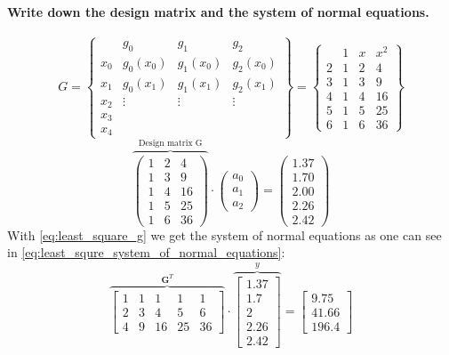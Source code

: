 \paragraph{Write down the design matrix and the system of normal equations.}
$$
G=
\left\{\begin{array}{c|ccc}
 & g_0 & g_1 & g_2 \\
\hline 
x_0 & g_0\left(x_0\right) & g_1\left(x_0\right) & g_2\left(x_0\right) \\
x_1 & g_0\left(x_1\right) & g_1\left(x_1\right) & g_2\left(x_1\right)\\
x_2 &\vdots&\vdots&\vdots \\
x_3 &  \\
x_4 &  
\end{array}\right\}
=
\left\{\begin{array}{c|ccc}
 & 1 & x & x^2 \\
\hline 
2 & 1 & 2 & 4 \\
3 & 1 & 3 & 9 \\
4 & 1 & 4 & 16 \\
5 & 1 & 5 & 25 \\
6 & 1 & 6 & 36 
\end{array}\right\}
$$
\begin{equation}
\overbrace{\left(\begin{array}{ccc}
1 & 2 & 4 \\
1 & 3 & 9 \\
1 & 4 & 16 \\
1 & 5 & 25 \\
1 & 6 & 36 
\end{array}\right)}^{\text{Design matrix G}} \cdot\left(\begin{array}{l}
a_0 \\
a_1 \\
a_2
\end{array}\right)=\left(\begin{array}{l}
1.37 \\
1.70 \\
2.00 \\
2.26 \\
2.42 
\end{array}\right)
\end{equation}
With  \autoref{eq:least_square_g} we get the system of normal equations as one can see in \autoref{eq:least_squre_system_of_normal_equations}:
$$
\overbrace{\left[\begin{array}{ccccc}
1 & 1 & 1 & 1 & 1 \\
2 & 3 & 4 & 5 & 6 \\
4 & 9 & 16 & 25 & 36
\end{array}\right]}^{\textbf{G}^T} \cdot \overbrace{\left[\begin{array}{c}
1.37 \\
1.7 \\
2 \\
2.26 \\
2.42
\end{array}\right]}^{y} =\left[\begin{array}{c}
9.75 \\
41.66 \\
196.4
\end{array}\right]
$$
